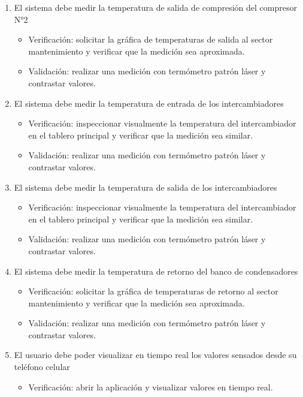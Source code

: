\documentclass[
11pt, %
]{charter}
\begin{document}
\begin{enumerate}
\begin{enumerate}
\begin{itemize}
			\end{itemize}
			\item El sistema debe medir la temperatura de salida de compresión del compresor N°2
			\begin{itemize}
				\item Verificación: solicitar la gráfica de temperaturas de salida al sector mantenimiento y verificar que la medición sea aproximada.
				\item Validación: realizar una medición con termómetro patrón láser y contrastar valores.
			\end{itemize}
			\item El sistema debe medir la temperatura de entrada de los intercambiadores
			\begin{itemize}
				\item Verificación: inspeccionar visualmente la temperatura del intercambiador en el tablero principal y verificar que la medición sea similar.
				\item Validación: realizar una medición con termómetro patrón láser y contrastar valores.
			\end{itemize}
			\item El sistema debe medir la temperatura de salida de los intercambiadores
			\begin{itemize}
				\item Verificación: inspeccionar visualmente la temperatura del intercambiador en el tablero principal y verificar que la medición sea similar.
				\item Validación: realizar una medición con termómetro patrón láser y contrastar valores.
			\end{itemize}
			\item El sistema debe medir la temperatura de retorno del banco de condensadores
			\begin{itemize}
				\item Verificación: solicitar la gráfica de temperaturas de retorno al sector mantenimiento y verificar que la medición sea aproximada.
				\item Validación: realizar una medición con termómetro patrón láser y contrastar valores.
			\end{itemize}
			\item El usuario debe poder visualizar en tiempo real los valores sensados desde su teléfono celular
			\begin{itemize}
				\item Verificación: abrir la aplicación y visualizar valores en tiempo real.

\end{itemize}
\end{enumerate}
\end{enumerate}
\end{document}
